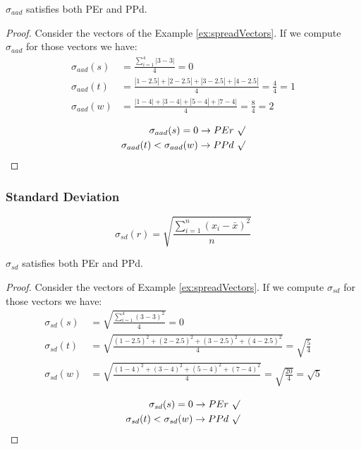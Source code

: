 \documentclass[version=3.21, pagesize, notitlepage, twoside=off, bibliography=totoc, DIV=calc, fontsize=12pt, a4paper]{scrartcl}
\begin{document}
\begin{proposition}
	$\sigma_{aad}$ satisfies both PEr and PPd.
\end{proposition}
\begin{proof}
	Consider the vectors of the Example \ref{ex:spreadVectors}.
	If we compute $\sigma_{aad}$ for those vectors we have:
	\begin{align}
	\sigma_{aad}(s) &= \frac{\sum_{i=1}^{4} |3-3|}{4} =0 \\
	\sigma_{aad}(t) &= \frac{|1-2.5|+|2-2.5|+|3-2.5|+|4-2.5|}{4}=\frac{4}{4}=1 \\
	\sigma_{aad}(w) &= \frac{|1-4|+|3-4|+|5-4|+|7-4|}{4}=\frac{8}{4}=2 \\
	\end{align}
	\begin{align}
	\sigma_{aad}(s) = 0 \rightarrow PEr \ \surd \\
	\sigma_{aad}(t) < \sigma_{aad}(w) \rightarrow PPd \ \surd \\
	\end{align}
\end{proof}

\subsubsection{Standard Deviation}
\[\sigma_{sd}(r)= \sqrt{\frac{\sum_{i=1}^{n}(x_i-\bar{x})^2}{n}}\]
\begin{proposition}
	$\sigma_{sd}$ satisfies both PEr and PPd.
\end{proposition}
\begin{proof}
	Consider the vectors of Example \ref{ex:spreadVectors}.
	If we compute $\sigma_{sd}$ for those vectors we have:
	\begin{align}
	\sigma_{sd}(s) &= \sqrt{\frac{\sum_{i=1}^{4} (3-3)^2}{4}}=0 \\
	\sigma_{sd}(t) &= \sqrt{\frac{(1-2.5)^2+(2-2.5)^2+(3-2.5)^2+(4-2.5)^2}{4}}=\sqrt{\frac{5}{4}} \\
	\sigma_{sd}(w) &= \sqrt{\frac{(1-4)^2+(3-4)^2+(5-4)^2+(7-4)^2}{4}}=\sqrt{\frac{20}{4}}=\sqrt{5} \\
	\end{align}
	\begin{align}
	\sigma_{sd}(s) = 0 \rightarrow PEr \ \surd \\
	\sigma_{sd}(t) < \sigma_{sd}(w) \rightarrow PPd \ \surd \\
	\end{align}
\end{proof}
\end{document}
